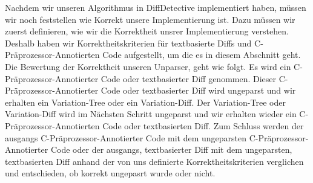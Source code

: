 Nachdem wir unseren Algorithmus in DiffDetective implementiert haben, müssen wir noch feststellen wie Korrekt unsere Implementierung ist. Dazu müssen wir zuerst definieren, wie wir die Korrektheit unsrer Implementierung verstehen. Deshalb haben wir Korrektheitskriterien für textbasierte Diffs und C-Präprozessor-Annotierten Code aufgestellt, um die es in diesem Abschnitt geht.\\

Die Bewertung der Korrektheit unseren Unparser, geht wie folgt. Es wird ein C-Präprozessor-Annotierter Code oder textbasierter Diff genommen. Dieser C-Präprozessor-Annotierter Code oder textbasierter Diff wird ungeparst und wir erhalten ein Variation-Tree oder ein Variation-Diff. Der Variation-Tree oder Variation-Diff wird im Nächsten Schritt ungeparst und wir erhalten wieder ein C-Präprozessor-Annotierten Code oder textbasierten Diff. Zum Schluss werden der ausgangs C-Präprozessor-Annotierter Code mit dem ungeparsten C-Präprozessor-Annotierter Code oder der ausgangs, textbasierter Diff mit dem ungeparsten, textbasierten Diff anhand der von uns definierte Korrektheitskriterien verglichen und entschieden, ob korrekt ungepasrt wurde oder nicht.\\

